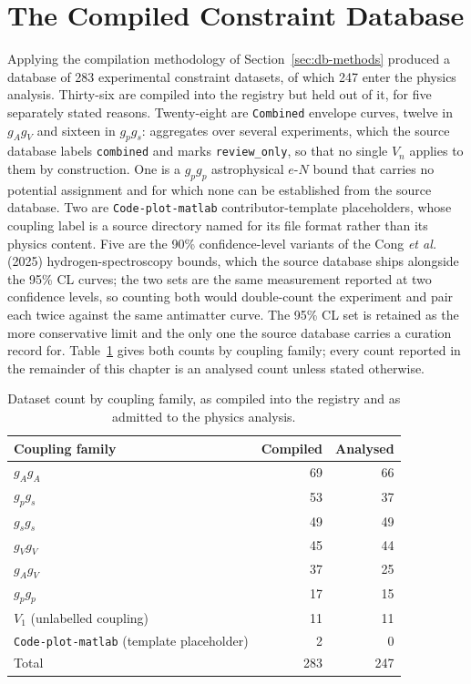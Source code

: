 \section{The Compiled Constraint Database}
\label{sec:results-db}

Applying the compilation methodology of Section~\ref{sec:db-methods}
produced a database of 283 experimental constraint datasets, of which 247
enter the physics analysis. Thirty-six are compiled into the registry but
held out of it, for five separately stated reasons. Twenty-eight are \texttt{Combined} envelope curves, twelve in $g_Ag_V$
and sixteen in $g_pg_s$: aggregates over several experiments, which the
source database labels \texttt{combined} and marks \texttt{review\_only},
so that no single $V_n$ applies to them by construction. One is a $g_pg_p$ astrophysical $e$-$N$ bound that carries no
potential assignment and for which none can be established from the source
database. Two are \texttt{Code-plot-matlab} contributor-template
placeholders, whose coupling label is a source directory named for its file
format rather than its physics content. Five are the 90\% confidence-level
variants of the Cong \textit{et al.} (2025) hydrogen-spectroscopy bounds,
which the source database ships alongside the 95\% CL curves; the two sets
are the same measurement reported at two confidence levels, so counting
both would double-count the experiment and pair each twice against the same
antimatter curve. The 95\% CL set is retained as the more conservative
limit and the only one the source database carries a curation record for.
Table~\ref{tab:coupling-breakdown}
gives both counts by coupling family; every count reported in the remainder
of this chapter is an analysed count unless stated otherwise.

\begin{table}[h]
\centering
\begin{tabular}{@{}lrr@{}}
\toprule
Coupling family & Compiled & Analysed \\
\midrule
$g_Ag_A$ & 69 & 66 \\
$g_pg_s$ & 53 & 37 \\
$g_sg_s$ & 49 & 49 \\
$g_Vg_V$ & 45 & 44 \\
$g_Ag_V$ & 37 & 25 \\
$g_pg_p$ & 17 & 15 \\
$V_1$ (unlabelled coupling) & 11 & 11 \\
\texttt{Code-plot-matlab} (template placeholder) & 2 & 0 \\
\midrule
Total & 283 & 247 \\
\bottomrule
\end{tabular}
\caption{Dataset count by coupling family, as compiled into the registry
and as admitted to the physics analysis.}
\label{tab:coupling-breakdown}
\end{table}

